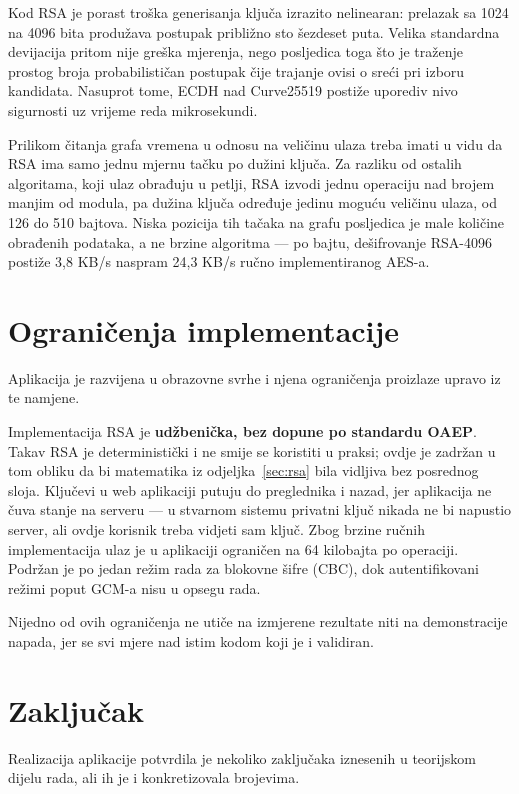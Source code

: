 Kod RSA je porast troška generisanja ključa izrazito nelinearan: prelazak sa 1024 na 4096 bita produžava postupak približno sto šezdeset puta. Velika standardna devijacija pritom nije greška mjerenja, nego posljedica toga što je traženje prostog broja probabilističan postupak čije trajanje ovisi o sreći pri izboru kandidata. Nasuprot tome, ECDH nad Curve25519 postiže uporediv nivo sigurnosti uz vrijeme reda mikrosekundi.

Prilikom čitanja grafa vremena u odnosu na veličinu ulaza treba imati u vidu da RSA ima samo jednu mjernu tačku po dužini ključa. Za razliku od ostalih algoritama, koji ulaz obrađuju u petlji, RSA izvodi jednu operaciju nad brojem manjim od modula, pa dužina ključa određuje jedinu moguću veličinu ulaza, od 126 do 510 bajtova. Niska pozicija tih tačaka na grafu posljedica je male količine obrađenih podataka, a ne brzine algoritma --- po bajtu, dešifrovanje RSA-4096 postiže 3,8 KB/s naspram 24,3 KB/s ručno implementiranog AES-a.

\section{Ograničenja implementacije}
\label{sec:ogranicenja}

Aplikacija je razvijena u obrazovne svrhe i njena ograničenja proizlaze upravo iz te namjene.

Implementacija RSA je \textbf{udžbenička, bez dopune po standardu OAEP}. Takav RSA je deterministički i ne smije se koristiti u praksi; ovdje je zadržan u tom obliku da bi matematika iz odjeljka~\ref{sec:rsa} bila vidljiva bez posrednog sloja. Ključevi u web aplikaciji putuju do preglednika i nazad, jer aplikacija ne čuva stanje na serveru --- u stvarnom sistemu privatni ključ nikada ne bi napustio server, ali ovdje korisnik treba vidjeti sam ključ. Zbog brzine ručnih implementacija ulaz je u aplikaciji ograničen na 64 kilobajta po operaciji. Podržan je po jedan režim rada za blokovne šifre (CBC), dok autentifikovani režimi poput GCM-a nisu u opsegu rada.

Nijedno od ovih ograničenja ne utiče na izmjerene rezultate niti na demonstracije napada, jer se svi mjere nad istim kodom koji je i validiran.

\section{Zaključak}
\label{sec:zakljucak-impl}

Realizacija aplikacije potvrdila je nekoliko zaključaka iznesenih u teorijskom dijelu rada, ali ih je i konkretizovala brojevima.

